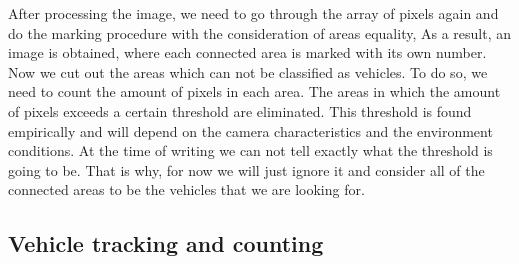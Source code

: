\documentclass[12pt,a4paper,oneside,titlepage]{article}
\begin{document}
After processing the image, we need to go through the array of pixels again and do the marking procedure with the consideration of areas equality,
As a result, an image is obtained, where each connected area is marked with its own number.
Now we cut out the areas which can not be classified as vehicles.
To do so, we need to count the amount of pixels in each area. The areas in which the amount of pixels exceeds a certain threshold are eliminated.
This threshold is found empirically and will depend on the camera characteristics and the environment conditions.
At the time of writing we can not tell exactly what the threshold is going to be.
That is why, for now we will just ignore it and consider all of the connected areas to be the vehicles that we are looking for. 









\subsection{Vehicle tracking and counting}
\end{document}
